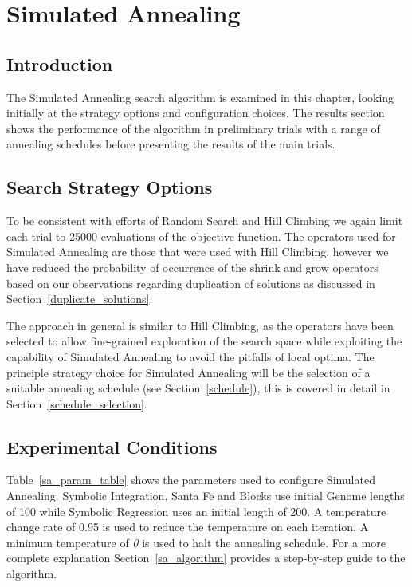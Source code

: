 \chapter{Simulated Annealing}
\section{Introduction}
The Simulated Annealing search algorithm is examined in this chapter, looking  initially at the strategy options and configuration choices. The results section shows the performance of the algorithm in preliminary trials with a range of annealing schedules before presenting the results of the main trials. 

\section{Search Strategy Options}
To be consistent with efforts of Random Search and Hill Climbing we again limit each trial to 25000 evaluations of the objective function. The operators used for Simulated Annealing are those that were used with Hill Climbing, however we have reduced the probability of occurrence of the shrink and grow operators based on our observations regarding duplication of solutions as discussed in Section~\ref{duplicate_solutions}.

The approach in general is similar to Hill Climbing, as the operators have been selected to allow fine-grained exploration of the search space while exploiting the capability of Simulated Annealing to avoid the pitfalls of local optima. The principle strategy choice for Simulated Annealing will be the selection of a suitable annealing schedule (see Section~\ref{schedule}), this is covered in detail in Section~\ref{schedule_selection}.



\section{Experimental Conditions}
Table~\ref{sa_param_table} shows the parameters used to configure Simulated Annealing. Symbolic Integration, Santa Fe and Blocks use initial Genome lengths of 100 while Symbolic Regression uses an initial length of 200. A temperature change rate of 0.95 is used to reduce the temperature on each iteration. A minimum temperature of \emph{0} is used to halt the annealing schedule. For a more complete explanation Section~\ref{sa_algorithm} provides a step-by-step guide to the algorithm.



